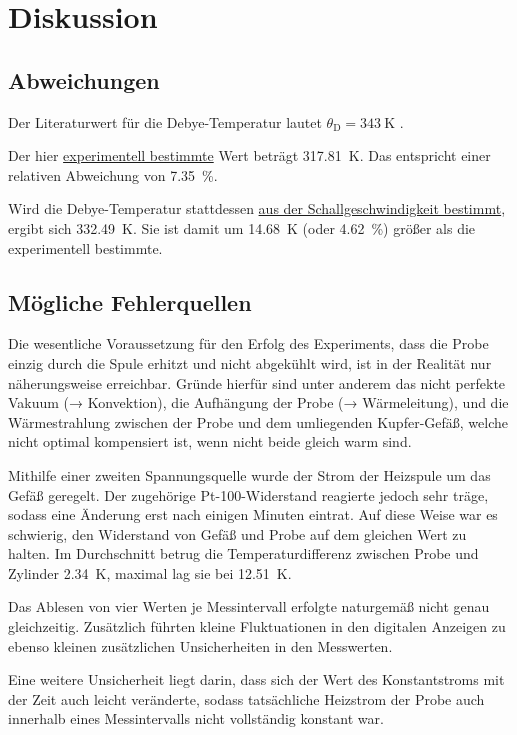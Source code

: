 \section{Diskussion}
\label{sec:diskussion}

\subsection{Abweichungen}

    Der Literaturwert für die Debye-Temperatur lautet $\theta_\text{D} = \SI{343}{\kelvin}$ \cite[Abbildung 6.9]{grossmarx}.

    Der hier \hyperref[sec:auswertung:debye_exp]{experimentell bestimmte} Wert beträgt \SI{317.81}{\kelvin}.
    Das entspricht einer relativen Abweichung von \SI{7.35}{\percent}.

    Wird die Debye-Temperatur stattdessen \hyperref[sec:auswertung:debye_vs]{aus der Schallgeschwindigkeit bestimmt},
    ergibt sich \SI{332.49}{\kelvin}.
    Sie ist damit um \SI{14.68}{\kelvin} (oder \SI{4.62}{\percent}) größer als die experimentell bestimmte.


\subsection{Mögliche Fehlerquellen}


    Die wesentliche Voraussetzung für den Erfolg des Experiments,
    dass die Probe einzig durch die Spule erhitzt und nicht abgekühlt wird,
    ist in der Realität nur näherungsweise erreichbar.
    Gründe hierfür sind unter anderem
    das nicht perfekte Vakuum (→ Konvektion),
    die Aufhängung der Probe (→ Wärmeleitung), %
    und die Wärmestrahlung zwischen der Probe und dem umliegenden Kupfer-Gefäß,
    welche nicht optimal kompensiert ist,
    wenn nicht beide gleich warm sind.

    Mithilfe einer zweiten Spannungsquelle wurde der Strom der Heizspule um das Gefäß geregelt.
    Der zugehörige Pt-100-Widerstand reagierte jedoch sehr träge,
    sodass eine Änderung erst nach einigen Minuten eintrat.
    Auf diese Weise war es schwierig,
    den Widerstand von Gefäß und Probe auf dem gleichen Wert zu halten.
    Im Durchschnitt betrug die Temperaturdifferenz zwischen Probe und Zylinder \SI{2.34}{\kelvin},
    maximal lag sie bei \SI{12.51}{\kelvin}.

    Das Ablesen von vier Werten je Messintervall erfolgte naturgemäß nicht genau gleichzeitig.
    Zusätzlich führten kleine Fluktuationen in den digitalen Anzeigen
    zu ebenso kleinen zusätzlichen Unsicherheiten in den Messwerten.

    Eine weitere Unsicherheit liegt darin,
    dass sich der Wert des Konstantstroms mit der Zeit auch leicht veränderte,
    sodass tatsächliche Heizstrom der Probe
    auch innerhalb eines Messintervalls nicht vollständig konstant war.
